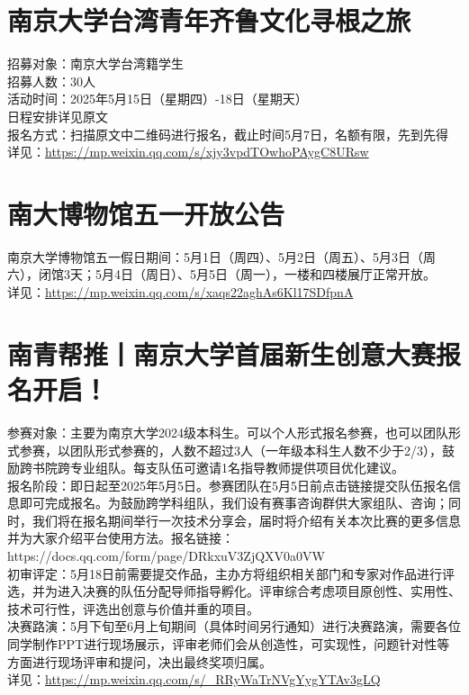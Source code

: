 \documentclass[letterpaper, 12pt]{article}
\begin{document}
\begin{multicols}{2}
\section{南京大学台湾青年齐鲁文化寻根之旅} %
招募对象：南京大学台湾籍学生
\\招募人数：30人
\\活动时间：2025年5月15日（星期四）-18日（星期天）
\\日程安排详见原文
\\报名方式：扫描原文中二维码进行报名，截止时间5月7日，名额有限，先到先得
\\详见：\url{https://mp.weixin.qq.com/s/xjy3vpdTOwhoPAygC8URsw}

\section{南大博物馆五一开放公告} %
南京大学博物馆五一假日期间：5月1日（周四）、5月2日（周五）、5月3日（周六），闭馆3天；5月4日（周日）、5月5日（周一），一楼和四楼展厅正常开放。
\\详见：\url{https://mp.weixin.qq.com/s/xaqs22aghAs6Kl17SDfpnA}

\section{南青帮推丨南京大学首届新生创意大赛报名开启！} %
参赛对象：主要为南京大学2024级本科生。可以个人形式报名参赛，也可以团队形式参赛，以团队形式参赛的，人数不超过3人（一年级本科生人数不少于2/3），鼓励跨书院跨专业组队。每支队伍可邀请1名指导教师提供项目优化建议。
\\报名阶段：即日起至2025年5月5日。参赛团队在5月5日前点击链接提交队伍报名信息即可完成报名。为鼓励跨学科组队，我们设有赛事咨询群供大家组队、咨询；同时，我们将在报名期间举行一次技术分享会，届时将介绍有关本次比赛的更多信息并为大家介绍平台使用方法。报名链接：https://docs.qq.com/form/page/DRkxuV3ZjQXV0a0VW
\\初审评定：5月18日前需要提交作品，主办方将组织相关部门和专家对作品进行评选，并为进入决赛的队伍分配导师指导孵化。评审综合考虑项目原创性、实用性、技术可行性，评选出创意与价值并重的项目。
\\决赛路演：5月下旬至6月上旬期间（具体时间另行通知）进行决赛路演，需要各位同学制作PPT进行现场展示，评审老师们会从创造性，可实现性，问题针对性等方面进行现场评审和提问，决出最终奖项归属。
\\详见：\url{https://mp.weixin.qq.com/s/_RRyWaTrNVgYygYTAv3gLQ}

\end{multicols}
\end{document}
